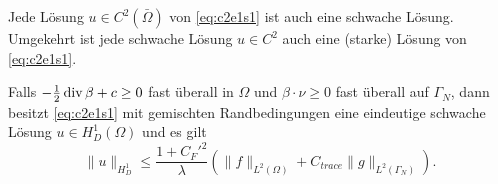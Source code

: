 \documentclass[../skript.tex]{subfiles}
\begin{document}
\begin{remark} %
\label{bem:c2e2s6}
Jede Lösung $u \in C^2(\bar{\Omega})$ von \cref{eq:c2e1s1} ist auch eine schwache Lösung.
Umgekehrt ist jede schwache Lösung $u \in C^2$ auch eine (starke) Lösung von \cref{eq:c2e1s1}.
\end{remark}
\begin{theorem} %
\label{thm:c2e2s7}
Falls $- \frac{1}{2} \operatorname{div} \beta + c \geq 0$ fast überall in $\Omega$ und $\beta \cdot \nu \geq 0$ fast überall auf $\Gamma_N$, dann besitzt \cref{eq:c2e1s1} mit gemischten Randbedingungen  eine eindeutige schwache Lösung $u \in H_D^1(\Omega)$ und es gilt
\[
	\| u \|_{H^1_D} \leq \frac{1 + {C_F'}^2}{\lambda} \left( \| f \|_{L^2(\Omega)} + C_{trace} \| g \|_{L^2(\Gamma_N)} \right).
\] 
\end{theorem}
\end{document}
